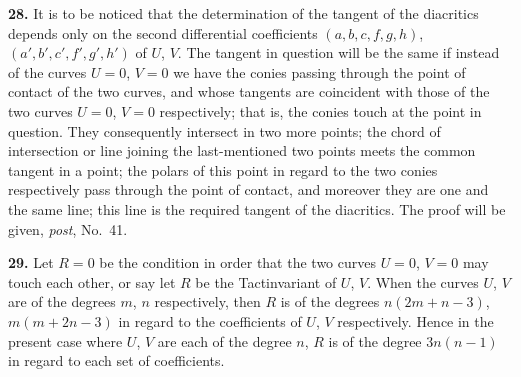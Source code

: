 \documentclass[11pt,a4paper]{article}
\begin{document}
\medskip

\textbf{28.} It is to be noticed that the determination of the tangent of the diacritics depends only on the second differential coefficients $(a, b, c, f, g, h)$, $(a', b', c', f', g', h')$ of $U$, $V$. The tangent in question will be the same if instead of the curves $U = 0$, $V = 0$ we have the conies passing through the point of contact of the two curves, and whose tangents are coincident with those of the two curves $U = 0$, $V = 0$ respectively; that is, the conies touch at the point in question. They consequently intersect in two more points; the chord of intersection or line joining the last-mentioned two points meets the common tangent in a point; the polars of this point in regard to the two conies respectively pass through the point of contact, and moreover they are one and the same line; this line is the required tangent of the diacritics. The proof will be given, \textit{post}, No.~41.

\medskip

\textbf{29.} Let $R = 0$ be the condition in order that the two curves $U = 0$, $V = 0$ may touch each other, or say let $R$ be the Tactinvariant of $U$, $V$. When the curves $U$, $V$ are of the degrees $m$, $n$ respectively, then $R$ is of the degrees $n(2m + n - 3)$, $m(m + 2n - 3)$ in regard to the coefficients of $U$, $V$ respectively. Hence in the present case where $U$, $V$ are each of the degree $n$, $R$ is of the degree $3n(n - 1)$ in regard to each set of coefficients.

\medskip
\end{document}
